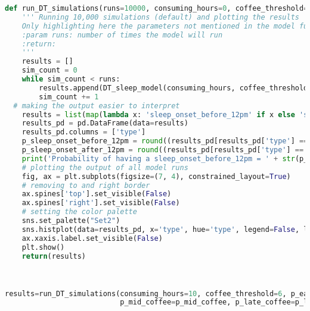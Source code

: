 \documentclass{homework}
\begin{document}
\begin{enumerate}
\begin{enumerate}[label=\alph*)]
\begin{lstlisting}[language=Python, caption=DT MC example 2, basicstyle=\tiny]
def run_DT_simulations(runs=10000, consuming_hours=0, coffee_threshold=0, p_early_coffee=0.7, p_mid_coffee=0.35, p_late_coffee=0.05): 
    ''' Running 10,000 simulations (default) and plotting the results
    Only highlighting here the parameters not mentioned in the model function
    :param runs: number of times the model will run
    :return:
    '''
    results = []
    sim_count = 0
    while sim_count < runs:
        results.append(DT_sleep_model(consuming_hours, coffee_threshold, p_early_coffee, p_mid_coffee, p_late_coffee))
        sim_count += 1
  # making the output easier to interpret
    results = list(map(lambda x: 'sleep_onset_before_12pm' if x else 'sleep_onset_after_12pm', results))
    results_pd = pd.DataFrame(data=results)
    results_pd.columns = ['type']
    p_sleep_onset_before_12pm = round((results_pd[results_pd['type'] == 'sleep_onset_before_12pm'].count().values[0])/float(runs), 2)
    p_sleep_onset_after_12pm = round((results_pd[results_pd['type'] == 'sleep_onset_after_12pm'].count().values[0]) / float(runs), 2)
    print('Probability of having a sleep_onset_before_12pm = ' + str(p_sleep_onset_before_12pm) + ' || Probability of a sleep_onset_after_12pm = ' + str(p_sleep_onset_after_12pm))
    # plotting the output of all model runs
    fig, ax = plt.subplots(figsize=(7, 4), constrained_layout=True)
    # removing to and right border
    ax.spines['top'].set_visible(False)
    ax.spines['right'].set_visible(False)
    # setting the color palette
    sns.set_palette("Set2")
    sns.histplot(data=results_pd, x='type', hue='type', legend=False, linewidth=0)
    ax.xaxis.label.set_visible(False)
    plt.show()
    return(results)

    

results=run_DT_simulations(consuming_hours=10, coffee_threshold=6, p_early_coffee=p_early_coffee,
                           p_mid_coffee=p_mid_coffee, p_late_coffee=p_late_coffee)
		\end{lstlisting}
	\end{enumerate}
\end{enumerate}
\exercise
\end{document}
